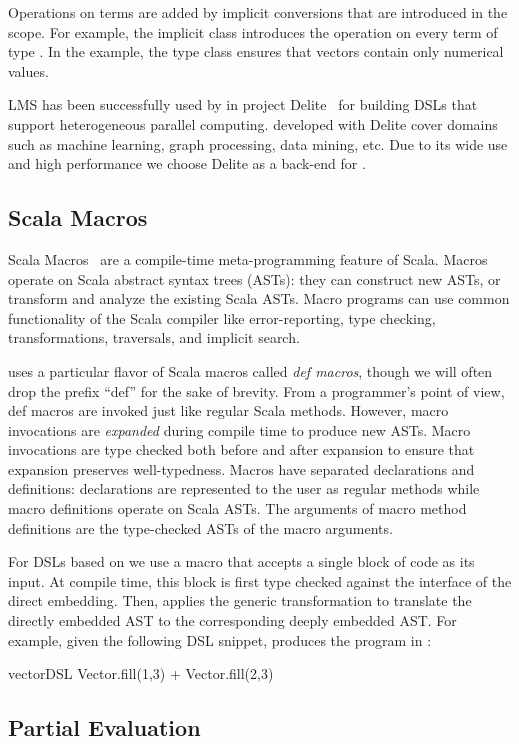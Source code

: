Operations on  terms are added by implicit conversions that are introduced in the \edsl scope. For example, the implicit class  introduces the \code{+} operation on every term of type . In the example, the type class  ensures that vectors contain only numerical values.

LMS has been successfully used by in project Delite~\cite{brown_heterogeneous_2011,composition-ecoop2013} for building DSLs that support heterogeneous parallel computing. \edsls developed with Delite cover domains
such as machine learning, graph processing, data mining, etc. Due to its wide use and high performance we choose Delite as a back-end for \yy.


\subsection{Scala Macros}
\label{sec:scala-macros}

Scala Macros~\cite{burmako_scala_2013} are a compile-time meta-programming
feature of Scala. Macros operate on Scala abstract syntax trees (ASTs): they
can construct new ASTs, or transform and analyze the existing Scala ASTs.
Macro programs can use common functionality of the Scala compiler like
error-reporting, type checking, transformations, traversals, and implicit
search.

\yy uses a particular flavor of Scala macros called \emph{def
  macros}, though we will often drop the prefix ``def'' for the
sake of brevity.  From a programmer's point of view, def macros
are invoked just like regular Scala methods.  However, macro
invocations are \emph{expanded} during compile time to produce new
ASTs.  Macro invocations are type checked both before and after
expansion to ensure that expansion preserves well-typedness.  Macros
have separated declarations and definitions: declarations are
represented to the user as regular methods while macro definitions
operate on Scala ASTs.  The arguments of macro method definitions are
the type-checked ASTs of the macro arguments.

For DSLs based on \yy we use a macro that accepts a single block of
code as its input. At compile time, this block is first type checked
against the interface of the direct embedding. Then, \yy applies the
generic transformation to translate the directly embedded AST to the
corresponding deeply embedded AST.  For example, given the following
DSL snippet, \yy produces the  program in
:\begin{lstparagraph}
vectorDSL {
  Vector.fill(1,3) + Vector.fill(2,3)
}
\end{lstparagraph}

\subsection{Partial Evaluation}
\label{sec:partial-evaluation}
